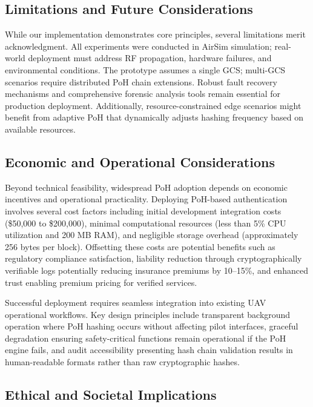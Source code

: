 \documentclass[preprint,12pt]{elsarticle}
\begin{document}
\subsection{Limitations and Future Considerations}

While our implementation demonstrates core principles, several limitations merit acknowledgment. All experiments were conducted in AirSim simulation; real-world deployment must address RF propagation, hardware failures, and environmental conditions. The prototype assumes a single GCS; multi-GCS scenarios require distributed PoH chain extensions. Robust fault recovery mechanisms and comprehensive forensic analysis tools remain essential for production deployment. Additionally, resource-constrained edge scenarios might benefit from adaptive PoH that dynamically adjusts hashing frequency based on available resources.

\subsection{Economic and Operational Considerations}

Beyond technical feasibility, widespread PoH adoption depends on economic incentives and operational practicality. Deploying PoH-based authentication involves several cost factors including initial development integration costs (\$50,000 to \$200,000), minimal computational resources (less than 5\% CPU utilization and 200 MB RAM), and negligible storage overhead (approximately 256 bytes per block). Offsetting these costs are potential benefits such as regulatory compliance satisfaction, liability reduction through cryptographically verifiable logs potentially reducing insurance premiums by 10--15\%, and enhanced trust enabling premium pricing for verified services.

Successful deployment requires seamless integration into existing UAV operational workflows. Key design principles include transparent background operation where PoH hashing occurs without affecting pilot interfaces, graceful degradation ensuring safety-critical functions remain operational if the PoH engine fails, and audit accessibility presenting hash chain validation results in human-readable formats rather than raw cryptographic hashes.

\subsection{Ethical and Societal Implications}
\end{document}

